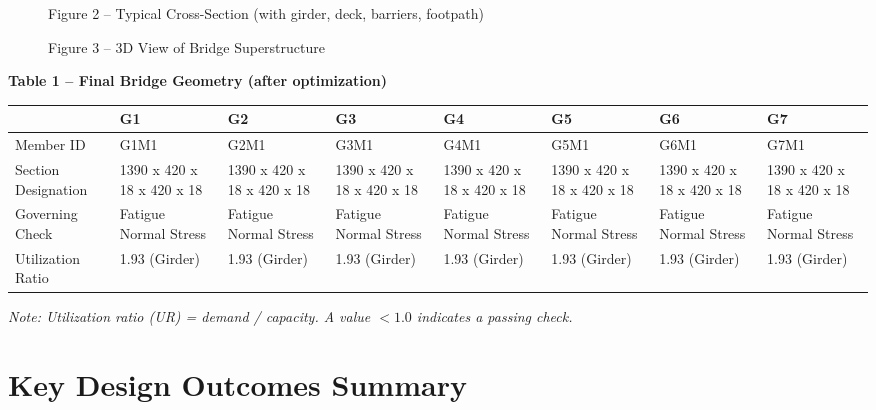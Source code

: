\documentclass[12pt,a4paper]{report}
\numberwithin{table}{chapter}
\numberwithin{figure}{chapter}
\begin{document}
\newpage

\begin{figure}[H]
\centering
{}
\caption*{Figure 2 -- Typical Cross-Section (with girder, deck, barriers, footpath)}
\end{figure}

\begin{figure}[H]
\centering
{}
\caption*{Figure 3 -- 3D View of Bridge Superstructure}
\end{figure}

\noindent\textbf{Table 1 -- Final Bridge Geometry (after optimization)}

\vspace{0.4em}
\noindent
\begin{tabular}{|C{2.8cm}|C{1.7cm}|C{1.7cm}|C{1.7cm}|C{1.7cm}|C{1.7cm}|C{1.7cm}|C{1.7cm}|}
\hline
  \textbf{} &
  \textbf{G1} &
  \textbf{G2} &
  \textbf{G3} &
  \textbf{G4} &
  \textbf{G5} &
  \textbf{G6} &
  \textbf{G7} \\
\hline
Member ID & G1M1 & G2M1 & G3M1 & G4M1 & G5M1 & G6M1 & G7M1 \\
\hline
Section Designation & 1390 x 420 x 18 x 420 x 18 & 1390 x 420 x 18 x 420 x 18 & 1390 x 420 x 18 x 420 x 18 & 1390 x 420 x 18 x 420 x 18 & 1390 x 420 x 18 x 420 x 18 & 1390 x 420 x 18 x 420 x 18 & 1390 x 420 x 18 x 420 x 18 \\
\hline
Governing Check & Fatigue Normal Stress & Fatigue Normal Stress & Fatigue Normal Stress & Fatigue Normal Stress & Fatigue Normal Stress & Fatigue Normal Stress & Fatigue Normal Stress \\
\hline
Utilization Ratio & 1.93 (Girder) & 1.93 (Girder) & 1.93 (Girder) & 1.93 (Girder) & 1.93 (Girder) & 1.93 (Girder) & 1.93 (Girder) \\
\hline
\end{tabular}

\vspace{0.4em}
\noindent\textit{Note: Utilization ratio (UR) = demand / capacity. A value $< 1.0$ indicates a passing check.}

\vspace{1em}

\section*{Key Design Outcomes Summary}
\label{sec:key-outcomes}
\end{document}
